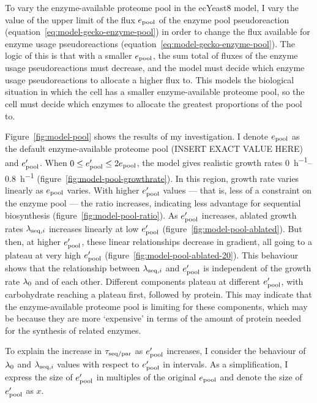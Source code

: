 To vary the enzyme-available proteome pool in the ecYeast8 model,
I vary the value of the upper limit of the flux $e_{\mathrm{pool}}$ of the enzyme pool pseudoreaction (equation~\ref{eq:model-gecko-enzyme-pool}) in order to change the flux available for enzyme usage pseudoreactions (equation~\ref{eq:model-gecko-enzyme-pool}).
The logic of this is that with a smaller $e_{\mathrm{pool}}$, the sum total of fluxes of the enzyme usage pseudoreactions must decrease, and the model must decide which enzyme usage pseudoreactions to allocate a higher flux to.
This models the biological situation in which the cell has a smaller enzyme-available proteome pool, so the cell must decide which enzymes to allocate the greatest proportions of the pool to.

Figure~\ref{fig:model-pool} shows the results of my investigation.
I denote $e_{\mathrm{pool}}$ as the default enzyme-available proteome pool (INSERT EXACT VALUE HERE) and $e_{\mathrm{pool}}^{\prime}$.
When $0 \leq e_{\mathrm{pool}}^{\prime} \leq 2e_{\mathrm{pool}}$, the model gives realistic growth rates \SIrange{0}{0.8}{\hour^{-1}} (figure~\ref{fig:model-pool-growthrate}).
In this region, growth rate varies linearly as $e_{\mathrm{pool}}$ varies.
With higher $e_{\mathrm{pool}}^{\prime}$ values --- that is, less of a constraint on the enzyme pool --- the ratio increases, indicating less advantage for sequential biosynthesis (figure~\ref{fig:model-pool-ratio}).
As $e_{\mathrm{pool}}^{\prime}$ increases, ablated growth rates $\lambda_{\mathrm{seq},i}$ increases linearly at low $e_{\mathrm{pool}}^{\prime}$ (figure~\ref{fig:model-pool-ablated}).
But then, at higher $e_{\mathrm{pool}}^{\prime}$, these linear relationships decrease in gradient, all going to a plateau at very high $e_{\mathrm{pool}}^{\prime}$ (figure~\ref{fig:model-pool-ablated-20}).
This behaviour shows that the relationship between $\lambda_{\mathrm{seq},i}$ and $e_{\mathrm{pool}}^{\prime}$ is independent of the growth rate $\lambda_{0}$ and of each other.
Different components plateau at different $e_{\mathrm{pool}}^{\prime}$, with carbohydrate reaching a plateau first, followed by protein.
This may indicate that the enzyme-available proteome pool is limiting for these components, which may be because they are more `expensive' in terms of the amount of protein needed for the synthesis of related enzymes.

To explain the increase in $\tau_{\mathrm{seq}/\mathrm{par}}$ as $e_{\mathrm{pool}}^{\prime}$ increases, I consider the behaviour of $\lambda_{0}$ and $\lambda_{\mathrm{seq},i}$ values with respect to $e_{\mathrm{pool}}^{\prime}$ in intervals.
As a simplification, I express the size of $e_{\mathrm{pool}}^{\prime}$ in multiples of the original $e_{\mathrm{pool}}$ and denote the size of $e_{\mathrm{pool}}^{\prime}$ as $x$.

